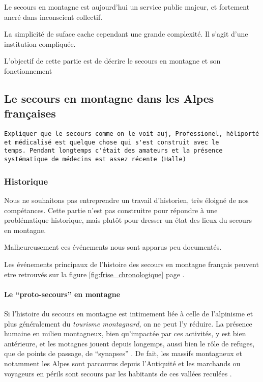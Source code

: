 Le secours en montagne est aujourd'hui un service public majeur, et
fortement ancré dans inconscient collectif.

La simplicité de suface cache cependant une grande complexité. Il
s'agit d'une institution compliquée.

L'objectif de cette partie est de décrire le secours en montagne et
son fonctionnement

\subsection{Le secours en montagne dans les Alpes françaises}
\label{subsec:1-1-1}


\begin{verbatim}
Expliquer que le secours comme on le voit auj, Professionel, héliporté
et médicalisé est quelque chose qui s'est construit avec le
temps. Pendant longtemps c'était des amateurs et la présence
systématique de médecins est assez récente (Halle)
\end{verbatim}

\subsubsection{Historique}
\label{subsubsec:1-1-1-1}

Nous ne souhaitons pas entreprendre un travail d'historien, très
éloigné de nos compétances. Cette partie n'est pas construitre pour
répondre à une problématique historique, mais plutôt pour dresser un
état des lieux du secours en montagne.

Malheureusement ces événements nous sont apparus peu documentés.

Les événements principaux de l'histoire des secours en montagne
français peuvent etre retrouvés sur la figure
\ref{fig:frise_chronologique} page \pageref{fig:frise_chronologique}.


\paragraph{Le \enquote{proto-secours} en montagne}
\label{par:1-1-1-1-1}

Si l'histoire du secours en montagne est intimement liée à celle de
l'alpinisme et plus généralement du \emph{tourisme montagnard,} on ne
peut l'y réduire. La présence humaine en milieu montagneux, bien
qu'impactée par ces activités, y est bien antérieure, et les motagnes
jouent depuis longemps, aussi bien le rôle de refuges, que de points
de passage, de \enquote{synapses} \autocite[p. 337]{Brunet1992}. De
fait, les massifs montagneux et notamment les Alpes sont parcourus
depuis l'Antiquité et les marchands ou voyageurs en périls sont
secours par les habitants de ces vallées reculées
\autocite{Mezin2016}.

